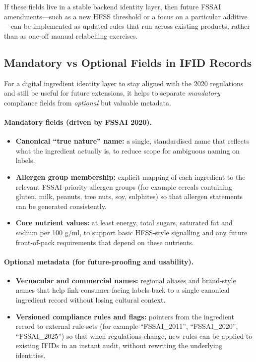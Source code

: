 \documentclass[12pt,a4paper]{article}
\begin{document}
If these fields live in a stable backend identity layer, then future FSSAI amendments---such as a new HFSS threshold or a focus on a particular additive---can be implemented as updated rules that run across existing products, rather than as one-off manual relabelling exercises.

\subsection{Mandatory vs Optional Fields in IFID Records}

For a digital ingredient identity layer to stay aligned with the 2020 regulations and still be useful for future extensions, it helps to separate \emph{mandatory} compliance fields from \emph{optional} but valuable metadata.

\paragraph{Mandatory fields (driven by FSSAI 2020).}

\begin{itemize}
  \item \textbf{Canonical ``true nature'' name:} a single, standardised name that reflects what the ingredient actually is, to reduce scope for ambiguous naming on labels.
  \item \textbf{Allergen group membership:} explicit mapping of each ingredient to the relevant FSSAI priority allergen groups (for example cereals containing gluten, milk, peanuts, tree nuts, soy, sulphites) so that allergen statements can be generated consistently.
  \item \textbf{Core nutrient values:} at least energy, total sugars, saturated fat and sodium per 100 g/ml, to support basic HFSS-style signalling and any future front-of-pack requirements that depend on these nutrients.
\end{itemize}

\paragraph{Optional metadata (for future-proofing and usability).}

\begin{itemize}
  \item \textbf{Vernacular and commercial names:} regional aliases and brand-style names that help link consumer-facing labels back to a single canonical ingredient record without losing cultural context.
  \item \textbf{Versioned compliance rules and flags:} pointers from the ingredient record to external rule-sets (for example ``FSSAI\_2011'', ``FSSAI\_2020'', ``FSSAI\_2025'') so that when regulations change, new rules can be applied to existing IFIDs in an instant audit, without rewriting the underlying identities.
\end{itemize}
\end{document}
